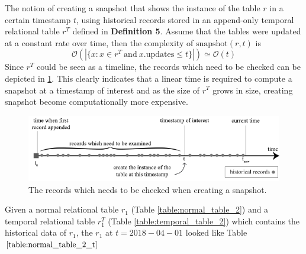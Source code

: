 		\begin{prop}
			The notion of creating a snapshot that shows the instance of the table $r$ in a certain timestamp $t$, using historical records stored in an append-only temporal relational table $r^T$ defined in \textbf{Definition 5}. Assume that the tables were updated at a constant rate over time, then the complexity of $\mathrm{snapshot}(r, t)$ is $$\mathcal{O}(|\{x: x\in r^T\mathrm{\ and\ } x.\mathrm{updates} \leq t\}|)\simeq \mathcal{O}(t)$$ 
			Since $r^T$ could be seen as a timeline, the records which need to be checked can be depicted in \ref{fig:checked_records}. This clearly indicates that a linear time is required to compute a snapshot at a timestamp of interest and as the size of $r^T$ grows in size, creating snapshot become computationally more expensive.
		\label{prop:linear_time}
		\end{prop}

		\begin{figure}[b]
			\centering
			\includegraphics[width=\textwidth]{figs/tobechecked_records.pdf}
			\caption{The records which needs to be checked when creating a snapshot.}
			\label{fig:checked_records}
		\end{figure}

		\begin{example}
			Given a normal relational table $r_1$ (Table \ref{table:normal_table_2}) and a temporal relational table $r_1^T$ (Table \ref{table:temporal_table_2}) which contains the historical data of $r_1$, the $r_1$ at $t=2018-04-01$ looked like Table $\ref{table:normal_table_2_t}$
		\label{example:snapshot_table}
		\end{example}

